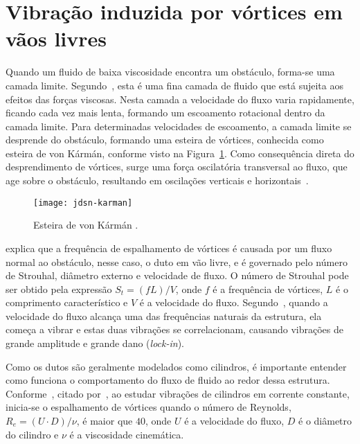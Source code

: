 \section{Vibração induzida por vórtices em vãos livres}

Quando um fluido de baixa viscosidade encontra um obstáculo, forma-se uma camada limite. Segundo~\citet{Currie2002}, esta é uma fina camada de fluido que está sujeita aos efeitos das forças viscosas. Nesta camada a velocidade do fluxo varia rapidamente, ficando cada vez mais lenta, formando um escoamento rotacional dentro da camada limite. Para determinadas velocidades de escoamento, a camada limite se desprende do obstáculo, formando uma esteira de vórtices, conhecida como esteira de von Kármán, conforme visto na Figura~\ref{fig:jdsn-karman}. Como consequência direta do desprendimento de vórtices, surge uma força oscilatória transversal ao fluxo, que age sobre o obstáculo, resultando em oscilações verticais e horizontais~\cite{Nielsen2002}.

\begin{figure}[!hbt]
\begin{center}
\texttt{[image: jdsn-karman]}
\caption{Esteira de von Kármán \cite{VandenAbeele2012}.}
\label{fig:jdsn-karman} 
\end{center}
\end{figure}

\citet{Mork2003} explica que a frequência de espalhamento de vórtices é causada por um fluxo normal ao obstáculo, nesse caso, o duto em vão livre, e é governado pelo número de Strouhal, diâmetro externo e velocidade de fluxo.
O número de Strouhal pode ser obtido pela expressão $S_t = (f L) / V$, onde $f$ é a frequência de vórtices, $L$ é o comprimento característico e $V$ é a velocidade do fluxo.
Segundo~\citet{Mork2003}, quando a velocidade do fluxo alcança uma das frequências naturais da estrutura, ela começa a vibrar e estas duas vibrações se correlacionam, causando vibrações de grande amplitude e grande dano (\textit{lock-in}).

Como os dutos são geralmente modelados como cilindros, é importante entender como funciona o comportamento do fluxo de fluido ao redor dessa estrutura.
Conforme~\citet{Batchelor1967}, citado por~\citet{Sumer1995}, ao estudar vibrações de cilindros em corrente constante, inicia-se o espalhamento de vórtices quando o número de Reynolds, $R_e = (U\cdot D)/\nu$, é maior que $40$, onde $U$ é a velocidade do fluxo, $D$ é o diâmetro do cilindro e $\nu$ é a viscosidade cinemática.

